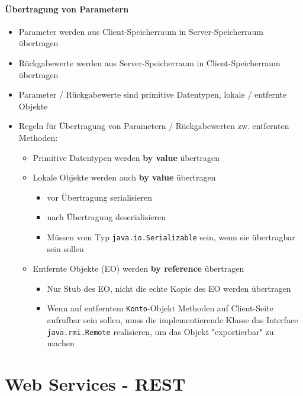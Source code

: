 \documentclass[a4paper]{article}
\begin{document}
				\paragraph{Übertragung von Parametern}
				
					\begin{itemize}
						\item Parameter werden aus Client-Speicherraum in Server-Speicherraum übertragen
						\item Rückgabewerte werden aus Server-Speicherraum in Client-Speicherraum übertragen
						\item Parameter / Rückgabewerte sind primitive Datentypen, lokale / entfernte Objekte\\
						
						\item Regeln für Übertragung von Parametern / Rückgabewerten zw. entfernten Methoden:
							\begin{itemize}
								\item Primitive Datentypen werden \textbf{by value} übertragen
								\item Lokale Objekte werden auch \textbf{by value} übertragen
									\begin{itemize}
										\item vor Übertragung serialisieren
										\item nach Übertragung deserialisieren
										\item Müssen vom Typ \texttt{java.io.Serializable} sein, wenn sie übertragbar sein sollen
									\end{itemize}
								\item Entfernte Objekte (EO) werden \textbf{by reference} übertragen
									\begin{itemize}
										\item Nur Stub des EO, nicht die echte Kopie des EO werden übertragen
										\item Wenn auf entferntem \texttt{Konto}-Objekt Methoden auf Client-Seite aufrufbar sein sollen, muss die implementierende Klasse das Interface \texttt{java.rmi.Remote} realisieren, um das Objekt "exportierbar" zu machen
									\end{itemize}
 							\end{itemize}
					\end{itemize}
				
	\newpage
	\section{Web Services - REST}
		
\end{document}
